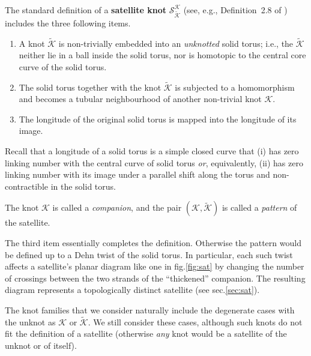 \documentclass[11pt]{article}
\def\Km{\mathcal{K}}
\def\Sm{\mathcal{S}}
\begin{document}
\

The standard definition of a \textbf{satellite knot} $\Sm_{\widetilde{\Km}}^{\Km}$ (see, e.g., Definition~2.8 of  \cite{KnotBook}) includes the three following items.
\begin{enumerate}
	\item{A knot $\widetilde{\Km}$ is non-trivially embedded into an \textit{unknotted} solid torus; i.e., the $\widetilde{\Km}$ neither lie in a ball inside the solid torus, nor is homotopic to the central core curve of the solid torus.}
	
	\item{The solid torus together with the knot $\widetilde{\Km}$ is subjected to a homomorphism and becomes a tubular neighbourhood of another non-trivial knot $\Km$.}
	\item{The longitude of the original solid torus is mapped into the longitude of its image.}
\end{enumerate}
Recall that a longitude of a solid torus is a simple closed curve that (i) has zero linking number with the central curve of solid torus \textit{or}, equivalently, (ii) has zero linking number with its image under a parallel shift along the torus and non-contractible in the solid torus.

The knot $\Km$ is called a \textit{companion}, and the pair $(\Km,\widetilde{\Km})$ is called a \textit{pattern} of the satellite. 

The third item essentially completes the definition. Otherwise the pattern would be defined up to a Dehn twist of the solid torus. In particular, each such twist affects a satellite's planar diagram like one in fig.\ref{fig:sat} by changing the number of crossings between the two strands of the ``thickened'' companion. The resulting diagram represents a topologically distinct satellite (see sec.\ref{sec:sat}).


The knot families that we consider naturally include the degenerate cases with the unknot as $\Km$ or $\widetilde{\Km}$. We still consider these cases, although such knots do not fit the definition of a satellite (otherwise \textit{any} knot would be a satellite of the unknot or of itself).
\end{document}

